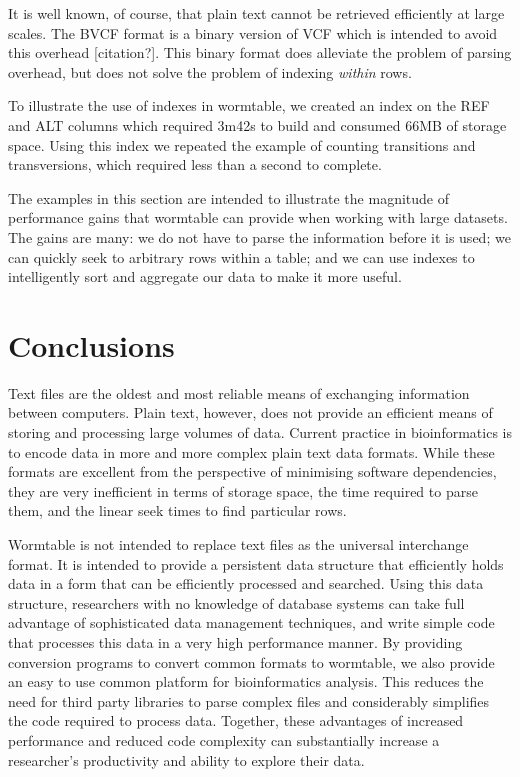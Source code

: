 \documentclass{bioinfo}
\begin{document}
It is well known, of course, that plain text cannot be retrieved 
efficiently at large scales. The BVCF format is a binary version 
of VCF which is intended to avoid this overhead [citation?]. 
This binary format does alleviate the problem of parsing overhead,
but does not solve the problem of indexing \emph{within} rows.

To illustrate the use of indexes in wormtable, we created an index 
on the REF and ALT columns which required 3m42s to build and 
consumed 66MB of storage space. Using this index we repeated the 
example of counting transitions and transversions, which required 
less than a second to complete.

The examples in this section are intended to illustrate the 
magnitude of performance gains that wormtable can provide 
when working with large datasets. The gains are many: we 
do not have to parse the information before it is used;
we can quickly seek to arbitrary rows within a table; and 
we can use indexes to intelligently sort and aggregate our
data to make it more useful.

\section{Conclusions}
Text files are the oldest and most reliable means of exchanging 
information between computers. Plain text, however, does not provide an efficient 
means of storing and processing large volumes of data. Current practice 
in bioinformatics is to encode data in more and more complex plain 
text data formats. While these formats are excellent from the perspective 
of minimising software dependencies, they are very inefficient in terms of 
storage space, the time required to parse them, and the linear
seek times to find particular rows.

Wormtable is not intended to replace text files as the universal 
interchange format. It is intended to provide a persistent data structure 
that efficiently holds data in a form that can be efficiently processed 
and searched. Using this data structure, researchers with no knowledge of 
database systems can take full advantage of sophisticated 
data management techniques, and write simple code that processes this 
data in a very high performance manner. 
By providing conversion programs to convert 
common formats to wormtable, we also provide an easy to 
use common platform for 
bioinformatics analysis. This reduces the need for third party libraries 
to parse complex files and considerably simplifies the code required 
to process data.
Together, these advantages of increased performance and reduced 
code complexity can substantially increase a researcher's 
productivity and ability to explore their data.
\end{document}
